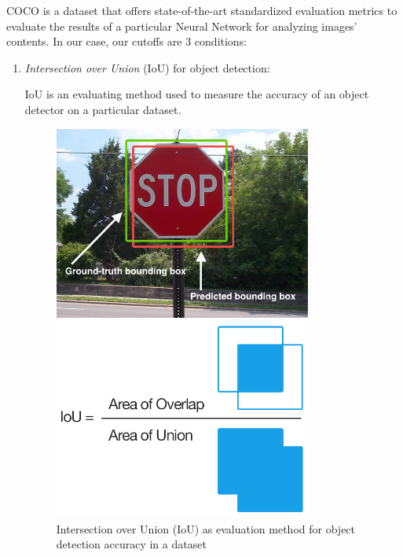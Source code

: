 COCO is a dataset that offers state-of-the-art standardized evaluation metrics to evaluate the results of a particular Neural Network for analyzing images' contents.
In our case, our cutoffs are 3 conditions:
\begin{enumerate}
	\item \emph{Intersection over Union} (IoU) for object detection:
	
	IoU is an evaluating method used to measure the accuracy of an object detector on a particular dataset.
	
	\begin{figure}[H]
		\centering
		\begin{minipage}{0.45\textwidth}
			\centering
			\includegraphics[width=0.8\textwidth]{images/iou_stop_sign.jpg} %
		\end{minipage}\hfill
		\begin{minipage}{0.45\textwidth}
			\centering
			\includegraphics[width=0.8\textwidth]{images/iou_equation.png} %
		\end{minipage}
		\caption{Intersection over Union (IoU) as evaluation method for object detection accuracy in a dataset}
		\label{f:iou}
	\end{figure}


\end{enumerate}

